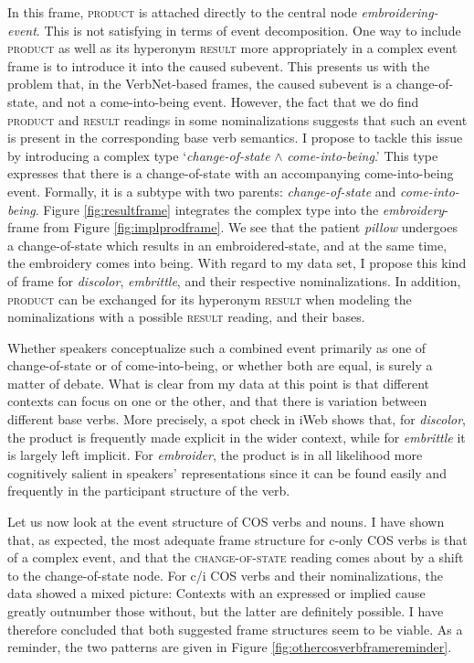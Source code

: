 In this frame, \textsc{product} is attached directly to the central node \textit{embroidering-event}. This is not satisfying in terms of event decomposition. One way to include \textsc{product} as well as its hyperonym \textsc{result} more appropriately in a complex event frame is to introduce it into the caused subevent. This presents us with the problem that, in the VerbNet-based frames, the caused subevent is a change-of-state, and not a come-into-being event. However, the fact that we do find \textsc{product} and \textsc{result} readings in some nominalizations suggests that such an event is present in the corresponding base verb semantics. I propose to tackle this issue by introducing a complex type `\textit{change-of-state} $\wedge$ \textit{come-into-being}.' This type expresses that there is a change-of-state with an accompanying come-into-being event. Formally, it is a subtype with two parents: \textit{change-of-state} and \textit{come-into-being}. 
Figure \ref{fig:resultframe} integrates the complex type into the \textit{embroidery}-frame from Figure \ref{fig:implprodframe}. We see that the patient \textit{pillow} undergoes a change-of-state which results in an embroidered-state, and at the same time, the embroidery comes into being. With regard to my data set, I propose this kind of frame for \textit{discolor}, \textit{embrittle}, and their respective nominalizations. In addition, \textsc{product} can be exchanged for its hyperonym \textsc{result} when modeling the nominalizations with a possible \textsc{result} reading, and their bases.

Whether speakers conceptualize such a combined event primarily as one of change-of-state or of come-into-being, or whether both are equal, is surely a matter of debate. What is clear from my data at this point is that different contexts can focus on one or the other, and that there is variation between different base verbs. More precisely, a spot check in \acs{iWeb} shows that, for \textit{discolor}, the product is frequently made explicit in the wider context, while for \textit{embrittle} it is largely left implicit. For \textit{embroider}, the product is in all likelihood more cognitively salient in speakers' representations since it can be found easily and frequently in the participant structure of the verb.

Let us now look at the event structure of COS verbs and nouns. 
I have shown that, as expected, the most adequate frame structure for c-only COS verbs is that of a complex event, and that the \textsc{change-of-state} reading comes about by a shift to the change-of-state node. For c/i COS verbs and their nominalizations, the data showed a mixed picture: Contexts with an expressed or implied cause greatly outnumber those without, but the latter are definitely possible. I have therefore concluded that both suggested frame structures seem to be viable. 
As a reminder, the two patterns are given in Figure \ref{fig:othercosverbframereminder}. 

